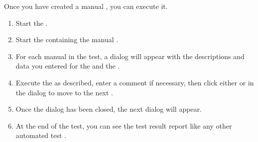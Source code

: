Once you have created a manual \gdcase{} , you can execute it.

\begin{enumerate}
\item Start the \gdaut{} .
\item Start the \gdsuite{} containing the manual \gdsteps{} .
\item For each manual \gdstep{} in the test, a dialog will appear with the descriptions and data you entered for the  and the . 
\item Execute the \gdstep{} as described, enter a comment if necessary, then click either  or  in the dialog to move to the next \gdstep{}.
\item Once the dialog has been closed, the next \gdstep{} dialog will appear.
\item At the end of the test, you can see the test result report like any other automated test .
\end{enumerate}
